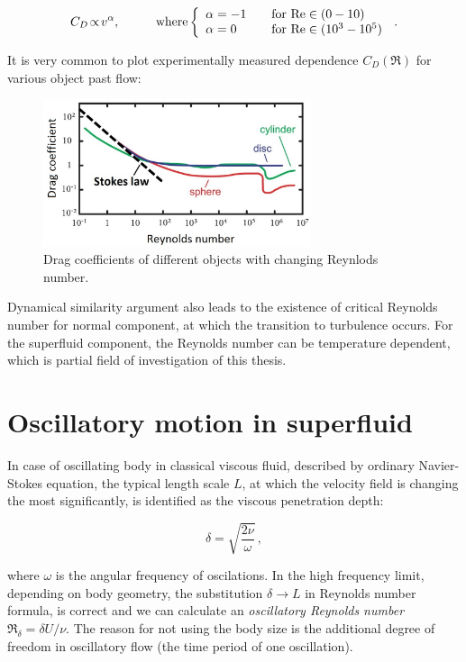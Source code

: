$$
C_D \!\propto\! v^\alpha, \hspace{1cm}
\text{where}
\left\{
  \begin{array}{l l}
    \alpha=-1 & \quad \text{for $\Re \in (0-10)$}\\
    \alpha=0 & \quad \text{for $\Re \in (10^3-10^5)$}
  \end{array}
\right.\,.
$$

It is very common to plot experimentally measured dependence $C_D(\Re)$ for various object past flow:

\begin{figure}[h]
	\centering
	\includegraphics[width=0.7\textwidth]{graphics/theory/C-Re}
	\caption{Drag coefficients of different objects with changing Reynlods number.}
	\label{C-Re}
\end{figure}

Dynamical similarity argument also leads to the existence of critical Reynolds number for normal component, at which the transition to turbulence occurs. For the superfluid component, the Reynolds number can be temperature dependent, which is partial field of investigation of this thesis.


\section{Oscillatory motion in superfluid}

In case of oscillating body in classical viscous fluid, described by ordinary Navier-Stokes equation, the typical length scale $L$, at which the velocity field is changing the most significantly, is identified as the viscous penetration depth:

\begin{equation}
\delta = \sqrt{\frac{2\nu}{\omega}}\,,
\label{penetration}
\end{equation}

where $\omega$ is the angular frequency of oscilations. In the high frequency limit, depending on
body geometry, the substitution $\delta \rightarrow L$ in Reynolds number formula, is correct and
we can calculate an \textit{oscillatory Reynolds number} $\Re_{\delta} = \delta U / \nu$. The reason
for not using the body size is the additional degree of freedom in oscillatory flow (the time
period of one oscillation).

